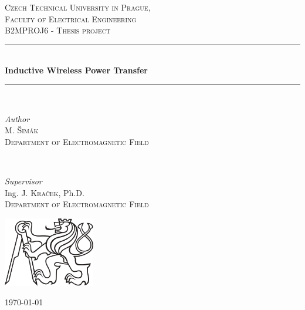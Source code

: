 \newcommand{\HRule}{\rule{\linewidth}{0.5mm}}
\center

\textsc{\LARGE Czech Technical University in Prague,\\Faculty of Electrical Engineering}\\[1.5cm]
\textsc{\Large B2MPROJ6 - Thesis project}\\[0.5cm]

\HRule\\[0.6cm]
{\huge\bfseries Inductive Wireless Power Transfer}\\[0.3cm] %
\HRule\\[1.5cm]

\begin{minipage}{0.45\textwidth}
    \begin{flushleft}
        \large
        \textit{Author}\\
        M. \textsc{Šimák}\\
        \textsc{Department of Electromagnetic Field}
    \end{flushleft}
\end{minipage}
~
\begin{minipage}{0.45\textwidth}
    \begin{flushright}
        \large
        \textit{Supervisor}\\
        Ing. J. \textsc{Kraček}, Ph.D.\\
        \textsc{Department of Electromagnetic Field}
    \end{flushright}
\end{minipage}

\vfill\vfill\vfill
\includegraphics[width=0.3\textwidth]{src/ctu_logo_black.jpg}

\vfill\vfill
{\large\monthyeardate\today}
\vfill